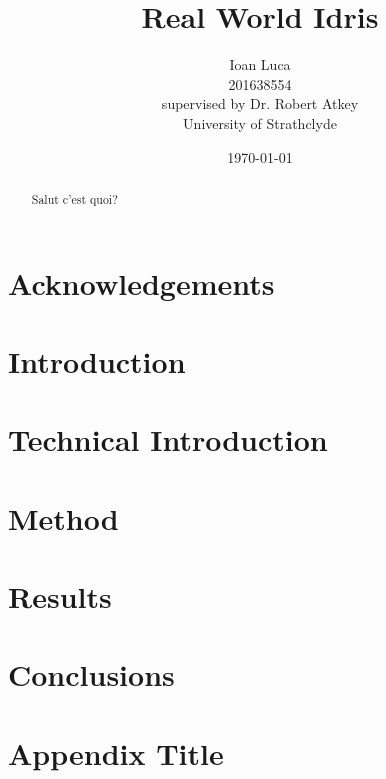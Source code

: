 \documentclass[a4paper, 12pt, oneside]{report}
\title{Real World Idris}
\author{Ioan Luca \\ 201638554 \\ \small supervised by Dr. Robert Atkey \\
	\small University of Strathclyde} %
\date{\today}
\begin{document}
\maketitle


\listoffigures
\listoftables

\chapter*{Acknowledgements}

\begin{abstract}
    Salut c'est quoi?
\end{abstract}

\tableofcontents


\chapter{Introduction}
\label{ch:intro}


\chapter{Technical Introduction}
\label{ch:techintro}

\chapter{Method}
\label{ch:method}

\chapter{Results}
\label{ch:results}

\chapter{Conclusions}
\label{ch:conc}

\appendix
\chapter{Appendix Title}




\end{document}
